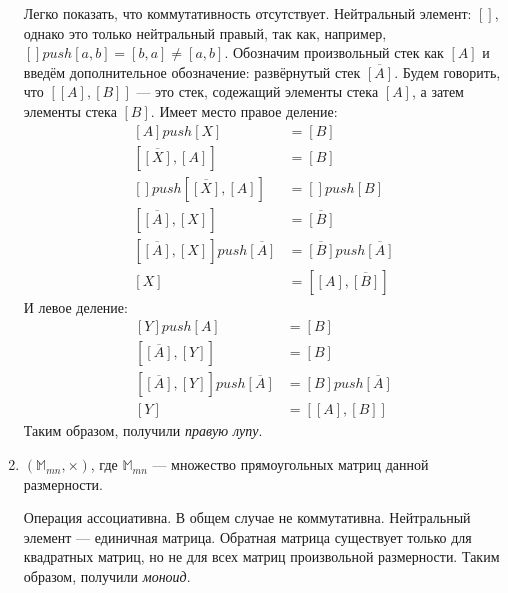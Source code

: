 \begin{task}
\begin{enumerate}
\begin{solution}
            Легко показать, что коммутативность отсутствует. Нейтральный элемент: $[]$, однако это только нейтральный правый, так как, например, $[]push[a,b]=[b,a]\ne [a,b]$. 
            Обозначим произвольный стек как $[A]$ и введём дополнительное обозначение: развёрнутый стек $\overline{[A]}$. Будем говорить, что $[[A],[B]]$ --- это стек, содежащий элементы стека $[A]$, а затем элементы стека $[B]$.
            Имеет место правое деление:
            \begin{equation*}
                \begin{aligned}
                    \left[ A \right]push[X]&=[B] \\
                    [\overline{[X]}, [A]]&=[B] \\
                    []push[\overline{[X]}, [A]] &= []push[B] \\
                    [\overline{[A]}, [X]] &= \overline{[B]} \\
                    [\overline{[A]}, [X]]push\overline{[A]} &= \overline{[B]}push\overline{[A]} \\
                    [X]&=[[A], \overline{[B]}]
                \end{aligned}
            \end{equation*}
            И левое деление:
            \begin{equation*}
                \begin{aligned}
                    \left[Y\right]push[A] &= [B] \\
                    [\overline{[A]}, [Y]] &= [B] \\
                    [\overline{[A]}, [Y]]push\overline{[A]} &= [B] push \overline{[A]} \\
                    [Y]&=[[A], [B]]
                \end{aligned}
            \end{equation*}
            Таким образом, получили \textit{правую лупу}.
        \end{solution}

        \item $(\mathbb{M}_{mn}, \times)$, где $\mathbb{M}_{mn}$ --- множество прямоугольных матриц данной размерности.\\
        \begin{solution}
            Операция ассоциативна. В общем случае не коммутативна. Нейтральный элемент --- единичная матрица. Обратная матрица существует только для квадратных матриц, но не для всех матриц произвольной размерности. Таким образом, получили \textit{моноид}.
        \end{solution}


\end{enumerate}
\end{task}
